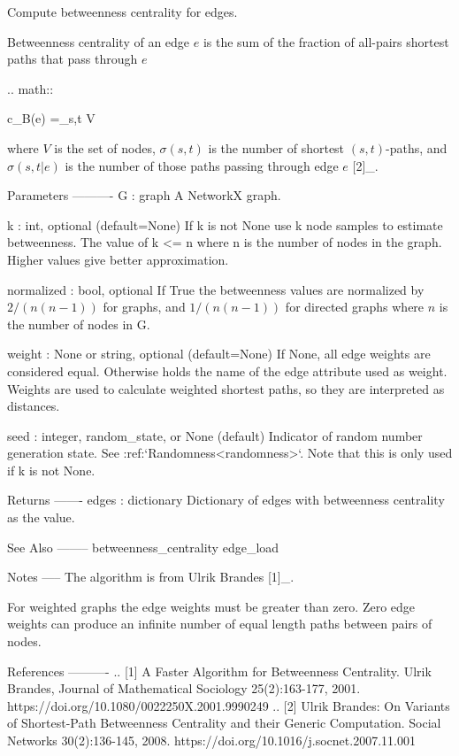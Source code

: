 \begin{DoxyVerb}Compute betweenness centrality for edges.

Betweenness centrality of an edge $e$ is the sum of the
fraction of all-pairs shortest paths that pass through $e$

.. math::

   c_B(e) =\sum_{s,t \in V} 

where $V$ is the set of nodes, $\sigma(s, t)$ is the number of
shortest $(s, t)$-paths, and $\sigma(s, t|e)$ is the number of
those paths passing through edge $e$ [2]_.

Parameters
----------
G : graph
  A NetworkX graph.

k : int, optional (default=None)
  If k is not None use k node samples to estimate betweenness.
  The value of k <= n where n is the number of nodes in the graph.
  Higher values give better approximation.

normalized : bool, optional
  If True the betweenness values are normalized by $2/(n(n-1))$
  for graphs, and $1/(n(n-1))$ for directed graphs where $n$
  is the number of nodes in G.

weight : None or string, optional (default=None)
  If None, all edge weights are considered equal.
  Otherwise holds the name of the edge attribute used as weight.
  Weights are used to calculate weighted shortest paths, so they are
  interpreted as distances.

seed : integer, random_state, or None (default)
    Indicator of random number generation state.
    See :ref:`Randomness<randomness>`.
    Note that this is only used if k is not None.

Returns
-------
edges : dictionary
   Dictionary of edges with betweenness centrality as the value.

See Also
--------
betweenness_centrality
edge_load

Notes
-----
The algorithm is from Ulrik Brandes [1]_.

For weighted graphs the edge weights must be greater than zero.
Zero edge weights can produce an infinite number of equal length
paths between pairs of nodes.

References
----------
.. [1]  A Faster Algorithm for Betweenness Centrality. Ulrik Brandes,
   Journal of Mathematical Sociology 25(2):163-177, 2001.
   https://doi.org/10.1080/0022250X.2001.9990249
.. [2] Ulrik Brandes: On Variants of Shortest-Path Betweenness
   Centrality and their Generic Computation.
   Social Networks 30(2):136-145, 2008.
   https://doi.org/10.1016/j.socnet.2007.11.001
\end{DoxyVerb}
 